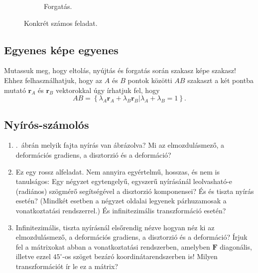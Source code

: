 \documentclass[12pt,a4paper]{scrartcl}
\let\mathbf\bm
\begin{document}
\begin{figure}[htb]
\begin{subfigure}[b]{0.45\textwidth}
\caption{Forgatás.}
\label{fig:forgatas_feladat}
\end{subfigure}
\label{fig:konret_szamos_feladat}
\caption{Konkrét számos feladat.}
\end{figure}
\FloatBarrier

\subsection{Egyenes képe egyenes}
Mutassuk meg, hogy eltolás, nyújtás és forgatás során szakasz képe szakasz! Ehhez felhasználhatjuk, hogy az $A$ és $B$ pontok közötti $AB$ szakaszt a két pontba mutató ${{\mathbf{r}}_A}$ és ${{\mathbf{r}}_B}$ vektorokkal úgy írhatjuk fel, hogy 
\[AB = \left\{ {\left. {{\lambda _A}{{\mathbf{r}}_A} + {\lambda _B}{{\mathbf{r}}_B}} \right|{\lambda _A} + {\lambda _B} = 1} \right\}.\]

\subsection{Nyírós-számolós}
\begin{enumerate}
\item {}.\ ábrán melyik fajta nyírás van ábrázolva? Mi az elmozdulásmező, a deformációs gradiens, a disztorzió és a deformáció?
\item Ez egy rossz alfeladat. Nem annyira egyértelmű, hosszas, és nem is tanulságos: Egy négyzet egytengelyű, egyszerű nyírásánál leolvasható-e (radiános) szögmérő segítségével a disztorzió komponensei? És és tiszta nyírás esetén? (Mindkét esetben a négyzet oldalai legyenek párhuzamosak a vonatkoztatási rendszerrel.) És infinitezimális transzformáció esetén?
\item Infinitezimális, tiszta nyírásnál elsőrendig nézve hogyan néz ki az elmozdulásmező, a deformációs gradiens, a disztorzió és a deformáció? Írjuk fel a mátrixokat abban a vonatkoztatási rendszerben, amelyben ${\mathbf{F}}$ diagonális, illetve ezzel $45^\circ$-os szöget bezáró koordinátarendszerben is! Milyen transzformációt ír le ez a mátrix?
\end{enumerate}
\end{document}
